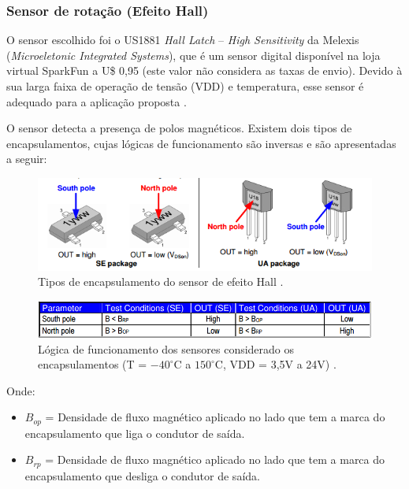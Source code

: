      
      \subsubsection{Sensor de rotação (Efeito Hall)}
	
	O sensor escolhido foi o US1881 \textit{Hall Latch} – \textit{High Sensitivity} da Melexis
	(\textit{Microeletonic Integrated Systems}), que é um sensor
	digital disponível na loja virtual SparkFun a U\$ 0,95 (este valor não considera as taxas de envio). Devido à sua larga
	faixa de operação de tensão (VDD) e temperatura, esse sensor é adequado para a aplicação proposta \cite{melexis}.
	
	O sensor detecta a presença de polos magnéticos. Existem dois tipos de encapsulamentos, cujas lógicas de funcionamento
	são inversas e são apresentadas a seguir:
	
	\begin{figure}[!htbp]
	  \centering
	  \includegraphics[scale=0.4]{editaveis/figuras/encapsulamento_sensor_efeito_hall}
	  \caption[Tipos de encapsulamento do sensor de efeito Hall]{Tipos de encapsulamento do sensor de efeito Hall \cite{melexis}.}
	  \label{encapsulamento_sensor_efeito_hall}
	\end{figure}
	
	\begin{figure}[!htbp]
	  \centering
	  \includegraphics[scale=0.5]{editaveis/figuras/funcionamento_sensores_encapsulamento}
	  \caption[Lógica de funcionamento dos sensores considerado os encapsulamentos]
	  {Lógica de funcionamento dos sensores considerado os encapsulamentos (T = $-40^\circ\mathrm{C}$ a $150^\circ\mathrm{C}$, VDD = 3,5V a 24V) \cite{melexis}.}
	  \label{funcionamento_sensores_encapsulamento}
	\end{figure}
	
	Onde:
	
	\begin{itemize}
	 \item $B_{op}$ = Densidade de fluxo magnético aplicado no lado que tem a marca do encapsulamento que liga o condutor de saída.
	 \item $B_{rp}$ = Densidade de fluxo magnético aplicado no lado que tem a marca do encapsulamento que desliga o condutor de saída.
	\end{itemize}
	
